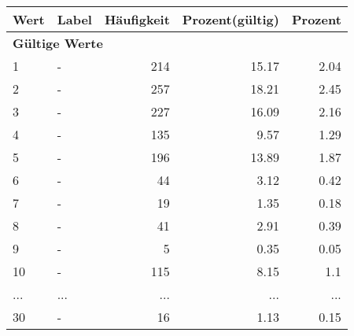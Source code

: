      \begin{longtable}{lXrrr}
     \toprule
     \textbf{Wert} & \textbf{Label} & \textbf{Häufigkeit} & \textbf{Prozent(gültig)} & \textbf{Prozent} \\
     \endhead
     \midrule
     \multicolumn{5}{l}{\textbf{Gültige Werte}}\\
        1 & \multicolumn{1}{X}{-} & %
          \num{214} &
          \num[round-mode=places,round-precision=2]{15,17} &
          \num[round-mode=places,round-precision=2]{2,04} \\
        2 & \multicolumn{1}{X}{-} & %
          \num{257} &
          \num[round-mode=places,round-precision=2]{18,21} &
          \num[round-mode=places,round-precision=2]{2,45} \\
        3 & \multicolumn{1}{X}{-} & %
          \num{227} &
          \num[round-mode=places,round-precision=2]{16,09} &
          \num[round-mode=places,round-precision=2]{2,16} \\
        4 & \multicolumn{1}{X}{-} & %
          \num{135} &
          \num[round-mode=places,round-precision=2]{9,57} &
          \num[round-mode=places,round-precision=2]{1,29} \\
        5 & \multicolumn{1}{X}{-} & %
          \num{196} &
          \num[round-mode=places,round-precision=2]{13,89} &
          \num[round-mode=places,round-precision=2]{1,87} \\
        6 & \multicolumn{1}{X}{-} & %
          \num{44} &
          \num[round-mode=places,round-precision=2]{3,12} &
          \num[round-mode=places,round-precision=2]{0,42} \\
        7 & \multicolumn{1}{X}{-} & %
          \num{19} &
          \num[round-mode=places,round-precision=2]{1,35} &
          \num[round-mode=places,round-precision=2]{0,18} \\
        8 & \multicolumn{1}{X}{-} & %
          \num{41} &
          \num[round-mode=places,round-precision=2]{2,91} &
          \num[round-mode=places,round-precision=2]{0,39} \\
        9 & \multicolumn{1}{X}{-} & %
          \num{5} &
          \num[round-mode=places,round-precision=2]{0,35} &
          \num[round-mode=places,round-precision=2]{0,05} \\
        10 & \multicolumn{1}{X}{-} & %
          \num{115} &
          \num[round-mode=places,round-precision=2]{8,15} &
          \num[round-mode=places,round-precision=2]{1,1} \\
       ... & ... & ... & ... & ... \\
        30 & \multicolumn{1}{X}{-} & %
          \num{16} &
          \num[round-mode=places,round-precision=2]{1,13} &
          \num[round-mode=places,round-precision=2]{0,15} \\


\end{longtable}
